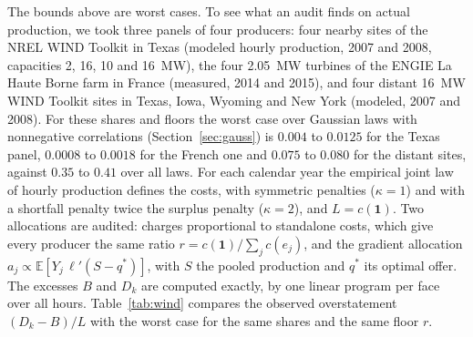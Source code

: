 \documentclass[11pt,a4paper]{article}
\theoremstyle{remark}
\newcommand{\one}{\mathbf 1}
\newcommand{\E}{\mathbb E}
\begin{document}
The bounds above are worst cases. To see what an audit finds on actual
production, we took three panels of four producers: four nearby sites of the
NREL WIND Toolkit in Texas (modeled hourly production, 2007 and 2008,
capacities 2, 16, 10 and 16~MW), the four 2.05~MW turbines of the ENGIE La
Haute Borne farm in France (measured, 2014 and 2015), and four distant 16~MW
WIND Toolkit sites in Texas, Iowa, Wyoming and New York (modeled, 2007 and
2008). For these shares and floors the worst case over Gaussian laws
with nonnegative correlations (Section~\ref{sec:gauss}) is $0.004$ to $0.0125$
for the Texas panel, $0.0008$ to $0.0018$ for the French one and $0.075$ to
$0.080$ for the distant sites, against $0.35$ to $0.41$ over all laws. For each calendar year the empirical
joint law of hourly production defines the costs, with symmetric penalties
($\kappa=1$) and with a shortfall penalty twice the surplus penalty
($\kappa=2$), and $L=c(\one)$. Two allocations are audited: charges
proportional to standalone costs, which give every producer the same ratio
$r=c(\one)/\sum_jc(e_j)$, and the gradient allocation $a_j\propto\E[Y_j\,
\ell'(S-q^*)]$, with $S$ the pooled production and $q^*$ its optimal offer.
The excesses $B$ and $D_k$ are computed exactly, by one linear program per
face over all hours. Table~\ref{tab:wind} compares the observed overstatement
$(D_k-B)/L$ with the worst case for the same shares and the same floor $r$.

\begin{table}[t]
\centering\small

\caption{Observed overstatement $(D_k-B)/L$ of the fractional audit on wind
data (largest value over two years and $\kappa\in\{1,2\}$) and the worst case
for the same shares and floor $r$ (range; depth one: best explicit family to
certificate bound; depth two: exact, Theorems~\ref{thm:lastdepth}
and~\ref{thm:asymlast}).}
\label{tab:wind}
\end{table}
\end{document}
